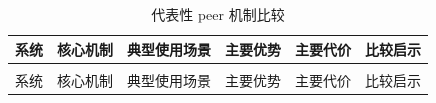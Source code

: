 \begin{longtable}[]{@{}
  >{\centering\arraybackslash}p{}
  >{\raggedright\arraybackslash}p{}
  >{\raggedright\arraybackslash}p{}
  >{\raggedright\arraybackslash}p{}
  >{\raggedright\arraybackslash}p{}
  >{\raggedright\arraybackslash}p{}@{}}
\caption{代表性 peer 机制比较}\label{tbl:peer-compare}\tabularnewline
\toprule\noalign{}
\begin{minipage}[t]{\hsize}\centering
系统
\end{minipage} & \begin{minipage}[t]{\hsize}\centering
核心机制
\end{minipage} & \begin{minipage}[t]{\hsize}\centering
典型使用场景
\end{minipage} & \begin{minipage}[t]{\hsize}\centering
主要优势
\end{minipage} & \begin{minipage}[t]{\hsize}\centering
主要代价
\end{minipage} & \begin{minipage}[t]{\hsize}\centering
比较启示
\end{minipage} \\
\midrule\noalign{}
\endfirsthead
\multicolumn{6}{r}{（续表\thetable）} \\
\toprule\noalign{}
\begin{minipage}[t]{\hsize}\centering
系统
\end{minipage} & \begin{minipage}[t]{\hsize}\centering
核心机制
\end{minipage} & \begin{minipage}[t]{\hsize}\centering
典型使用场景
\end{minipage} & \begin{minipage}[t]{\hsize}\centering
主要优势
\end{minipage} & \begin{minipage}[t]{\hsize}\centering
主要代价
\end{minipage} & \begin{minipage}[t]{\hsize}\centering
比较启示
\end{minipage} \\

\end{longtable}
